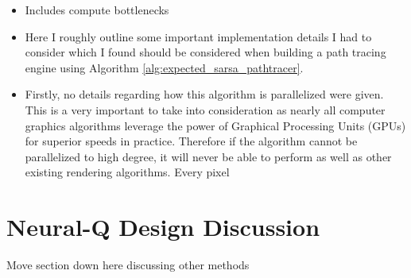 \documentclass[../dissertation.tex]{subfiles}
\begin{document}
\begin{itemize}
\item Includes compute bottlenecks

\item Here I roughly outline some important implementation details I had to consider which I found should be considered when building a path tracing engine using Algorithm \ref{alg:expected_sarsa_pathtracer}.

\item Firstly, no details regarding how this algorithm is parallelized were given. This is a very important to take into consideration as nearly all computer graphics algorithms leverage the power of Graphical Processing Units (GPUs) for superior speeds in practice. Therefore if the algorithm cannot be parallelized to high degree, it will never be able to perform as well as other existing rendering algorithms.  Every pixel %
\end{itemize}


\section{Neural-Q Design Discussion}
Move section down here discussing other methods
\end{document}
